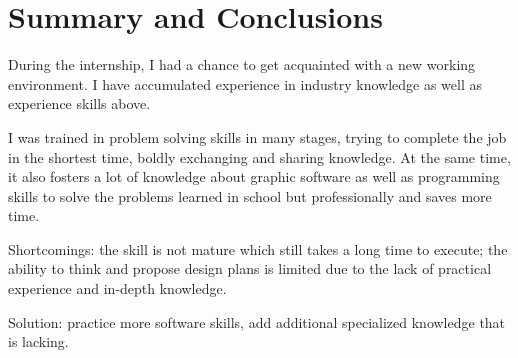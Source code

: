 \chapter{Summary and Conclusions}
During the internship, I had a chance to get acquainted with a new working environment. I have accumulated experience in industry knowledge as well as experience skills above.

I was trained in problem solving skills in many stages, trying to complete the job in the shortest time, boldly exchanging and sharing knowledge. At the same time, it also fosters a lot of knowledge about graphic software as well as programming skills to solve the problems learned in school but professionally and saves more time.

Shortcomings: the skill is not mature which still takes a long time to execute; the ability to think and propose design plans is limited due to the lack of practical experience and in-depth knowledge.

Solution: practice more software skills, add additional specialized knowledge that is lacking.

